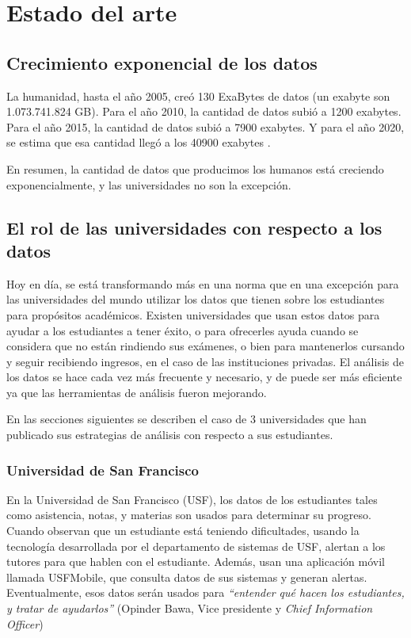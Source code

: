 \chapter{Estado del arte}
\label{sec:hello}

\section[Crecimiento exponencial de los datos]{Crecimiento exponencial de los datos} 


La humanidad, hasta el año 2005, creó 130 ExaBytes de datos (un exabyte son 1.073.741.824 GB). Para el año 2010, la cantidad de datos subió a 1200 exabytes. Para el año 2015, la cantidad de datos subió a 7900 exabytes. Y para el año 2020, se estima que esa cantidad llegó a los 40900 exabytes \cite{IDC}.

En resumen, la cantidad de datos que producimos los humanos está creciendo exponencialmente, y las universidades no son la excepción.



\section[El rol de las universidades con respecto a los datos]{El rol de las universidades con respecto a los datos}

Hoy en día, se está transformando más en una norma que en una excepción para las universidades del mundo utilizar los datos que tienen sobre los estudiantes para propósitos académicos. Existen universidades que usan estos datos para ayudar a los estudiantes a tener éxito, o para ofrecerles ayuda cuando se considera que no están rindiendo sus exámenes, o bien para mantenerlos cursando y seguir recibiendo ingresos, en el caso de las instituciones privadas.
El análisis de los datos se hace cada vez más frecuente y necesario, y de puede ser más eficiente ya que las herramientas de análisis fueron mejorando.

En las secciones siguientes se describen el caso de 3 universidades que han publicado sus estrategias de análisis con respecto a sus estudiantes.

\subsection[Universidad de San Francisco]{Universidad de San Francisco}

En la Universidad de San Francisco (USF), los datos de los estudiantes tales como asistencia, notas, y materias son usados para determinar su progreso. Cuando observan que un estudiante está teniendo dificultades, usando la tecnología desarrollada por el departamento de sistemas de USF, alertan a los tutores para que hablen con el estudiante.
Además, usan una aplicación móvil llamada USFMobile, que consulta datos de sus sistemas y generan alertas.
Eventualmente, esos datos serán usados para \textit{“entender qué hacen los estudiantes, y tratar de ayudarlos”} (Opinder Bawa, Vice presidente y \textit{Chief Information Officer})


